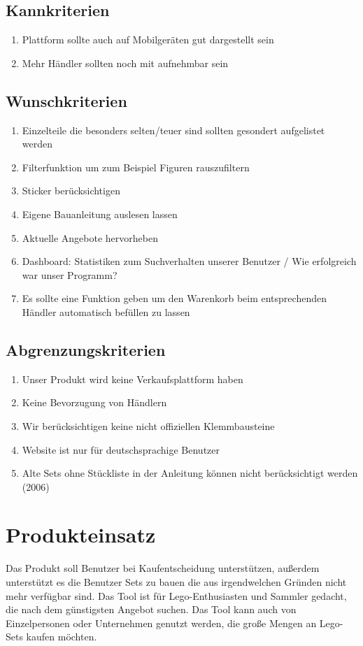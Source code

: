 \subsection{Kannkriterien}
\begin{enumerate}
\item Plattform sollte auch auf Mobilgeräten gut dargestellt sein
\item Mehr Händler sollten noch mit aufnehmbar sein
\end{enumerate}

\subsection{Wunschkriterien}
\begin{enumerate}
\item Einzelteile die besonders selten/teuer sind sollten gesondert aufgelistet werden
\item Filterfunktion um zum Beispiel Figuren rauszufiltern
\item Sticker berücksichtigen
\item Eigene Bauanleitung auslesen lassen
\item Aktuelle Angebote hervorheben
\item Dashboard: Statistiken zum Suchverhalten unserer Benutzer / Wie erfolgreich war unser Programm?
\item Es sollte eine Funktion geben um den Warenkorb beim entsprechenden Händler automatisch befüllen zu lassen
\end{enumerate}

\subsection{Abgrenzungskriterien}
\begin{enumerate}
\item Unser Produkt wird keine Verkaufsplattform haben
\item Keine Bevorzugung von Händlern
\item Wir berücksichtigen keine nicht offiziellen Klemmbausteine
\item Website ist nur für deutschsprachige Benutzer
\item Alte Sets ohne Stückliste in der Anleitung können nicht berücksichtigt werden (2006)
\end{enumerate}

\section{Produkteinsatz}
 Das Produkt soll Benutzer bei Kaufentscheidung unterstützen, außerdem unterstützt es die Benutzer Sets zu bauen die aus irgendwelchen Gründen nicht mehr verfügbar sind.\newline
Das Tool ist für Lego-Enthusiasten und Sammler gedacht, die nach dem günstigsten Angebot suchen. Das Tool kann auch von Einzelpersonen oder Unternehmen genutzt werden, die große Mengen an Lego-Sets kaufen möchten. \newline

